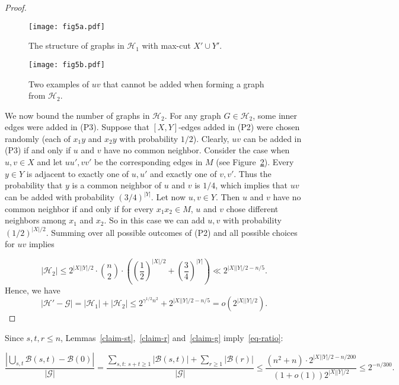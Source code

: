 \documentclass[12pt]{article}
\theoremstyle{definition}
\theoremstyle{definition}
\theoremstyle{definition}
\theoremstyle{definition}
\theoremstyle{definition}
\theoremstyle{definition}
\theoremstyle{definition}
\newcommand{\ga}{\gamma}
\newcommand{\cH}{\mathcal{H}}
\newcommand{\cG}{\mathcal{G}}
\newcommand{\cB}{\mathcal{B}}
\newcommand{\3}{\bf{3}}
\newcommand{\setm}{-}
\begin{document}
\begin{proof}
\begin{figure*}[t!]
    \centering
    \begin{subfigure}[t]{0.4\textwidth}
        \centering
        \texttt{[image: fig5a.pdf]}
        \caption{The structure of graphs in $\cH_1$ with max-cut $X'\cup Y'$.}\label{fig5a}
    \end{subfigure}%
    \hspace{2cm}
        \begin{subfigure}[t]{0.4\textwidth}
        \centering
        \texttt{[image: fig5b.pdf]}
        \caption{Two examples of $uv$ that cannot be added when forming a graph from $\cH_2$.}\label{fig5b}
    \end{subfigure}
  \caption{}
\end{figure*}

We now bound the number of graphs in $\cH_2$. For any graph $G\in \cH_2$, some inner edges were added in (P3). Suppose that $[X,Y]$-edges added in (P2) were chosen randomly (each of $x_1y$ and $x_2y$ with probability $1/2$). Clearly, $uv$ can be added in (P3) if and only if $u$ and $v$ have no common neighbor. Consider the case when $u,v\in X$ and let $uu', vv'$ be the corresponding edges in $M$ (see Figure~\ref{fig5b}). Every $y\in Y$ is adjacent to exactly one of $u,u'$ and exactly one of $v,v'$. Thus the probability that $y$ is a common neighbor of $u$ and $v$ is $1/4$, which implies that $uv$ can be added with probability $(3/4)^{|Y|}$. Let now $u,v\in Y$. Then $u$ and $v$ have no common neighbor if and only if for every $x_1x_2\in M$, $u$ and $v$ chose different neighbors among $x_1$ and $x_2$. So in this case we can add $u,v$ with probability $(1/2)^{|X|/2}.$ Summing over all possible outcomes of (P2) and all possible choices for $uv$ implies

$$|\cH_2|\le 2^{|X||Y|/2}\cdot {n\choose 2}\cdot \left(\left(\frac{1}{2}\right)^{|X|/2}+ \left(\frac{3}{4}\right)^{|Y|}\right)\ll 2^{|X||Y|/2-n/5}.$$
Hence, we have
$$|\cH'\setm \cG|=|\cH_1|+|\cH_2|\le 2^{\ga^{1/2}n^2}+ 2^{|X||Y|/2-n/5}=o(2^{|X||Y|/2}).$$
\end{proof}


Since $s,t,r\le n$, Lemmas~\ref{claim-st},~\ref{claim-r} and~\ref{claim-g} imply~\eqref{eq-ratio}:

$$\frac{\left|\displaystyle\bigcup_{s,t}\cB(s,t)\setm \cB(0)\right|}{|\cG|}=\frac{\displaystyle\sum_{s,t:~ s+t\ge 1}|\cB(s,t)|+\displaystyle\sum_{r\ge 1}|\cB(r)|}{|\cG|}\le \frac{(n^2+n)\cdot 2^{|X||Y|/2-n/200}}{(1+o(1))2^{|X||Y|/2}}\le 2^{-n/300}.$$
\end{document}
